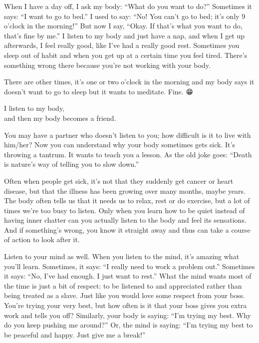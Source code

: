 \documentclass[12pt, openany]{book}
\newenvironment{aphorism}%
{%
\begin{center}\begin{itshape}
}%
{\end{itshape}\end{center}
}%
\begin{document}
When I have a day off, I ask my body: “What do you want to do?” Sometimes it says: “I want to go to bed.” I used to say: “No! You can’t go to bed; it’s only 9 o’clock in the morning!” But now I say, “Okay. If that’s what you want to do, that’s fine by me.” I listen to my body and just have a nap, and when I get up afterwards, I feel really good, like I’ve had a really good rest. Sometimes you sleep out of habit and when you get up at a certain time you feel tired. There’s something wrong there because you’re not working with your body. 

There are other times, it’s one or two o’clock in the morning and my body says it doesn’t want to go to sleep but it wants to meditate. Fine. 😁

\begin{aphorism}
I listen to my body,\\  
and then my body becomes a friend.
\end{aphorism}

You may have a partner who doesn’t listen to you; how difficult is it to live with him/her? Now you can understand why your body sometimes gets sick. It’s throwing a tantrum. It wants to teach you a lesson. As the old joke goes: “Death is nature’s way of telling you to slow down.” 

Often when people get sick, it’s not that they suddenly get cancer or heart disease, but that the illness has been growing over many months, maybe years. The body often tells us that it needs us to relax, rest or do exercise, but a lot of times we’re too busy to listen. Only when you learn how to be quiet instead of having inner chatter can you actually listen to the body and feel its sensations. And if something’s wrong, you know it straight away and thus can take a course of action to look after it. 

Listen to your mind as well. When you listen to the mind, it’s amazing what you’ll learn. Sometimes, it says: “I really need to work a problem out.” Sometimes it says: “No, I’ve had enough. I just want to rest.” What the mind wants most of the time is just a bit of respect: to be listened to and appreciated rather than being treated as a slave. Just like you would love some respect from your boss. You’re trying your very best, but how often is it that your boss gives you extra work and tells you off? Similarly, your body is saying: “I’m trying my best. Why do you keep pushing me around?” Or, the mind is saying: “I’m trying my best to be peaceful and happy. Just give me a break!” 
\end{document}
